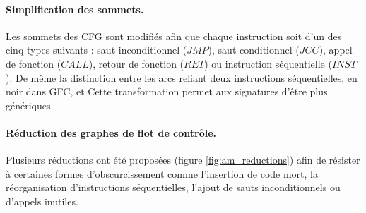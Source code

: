 \paragraph{Simplification des sommets.}
Les sommets des CFG sont modifiés afin que chaque instruction soit d'un des cinq types suivants : saut inconditionnel ($JMP$), saut conditionnel ($JCC$), appel de fonction ($CALL$), retour de fonction ($RET$) ou instruction séquentielle ($INST$). De même la distinction entre les arcs reliant deux instructions séquentielles, en noir dans GFC, et
Cette transformation permet aux signatures d'être plus génériques.

\paragraph{Réduction des graphes de flot de contrôle.}
Plusieurs réductions ont été proposées (figure \ref{fig:am_reductions}) afin de résister à certaines formes d'obscurcissement comme l'insertion de code mort, la réorganisation d'instructions séquentielles, l'ajout de sauts inconditionnels ou d'appels inutiles.


